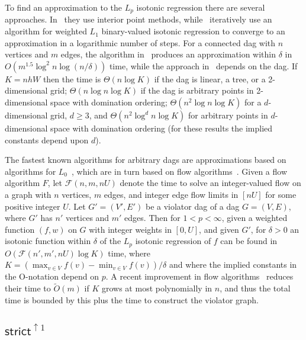 \documentclass[11pt]{article}
\begin{document}
To find an approximation to the $L_p$ isotonic regression there are several approaches.
In~\cite{Yale_AllLp} they use interior point methods, while~\cite{QPartition,QLpviaL0} iteratively use an algorithm for weighted $L_1$ binary-valued isotonic regression to converge to an approximation in a logarithmic number of steps.
For a connected dag with $n$ vertices and $m$ edges, the algorithm in~\cite{Yale_AllLp} produces an approximation within $\delta$ in $O(m^{1.5} \log^2 n \log (n/\delta))$ time, while the approach in~\cite{QPartition} depends on the dag.
If $K = nhW$ then the time is $\Theta(n \log K)$ if the dag is linear, a tree, or a 2-dimensional grid; $\Theta(n \log n \log K)$ if the dag is arbitrary points in 2-dimensional space with domination ordering; $\Theta(n^2 \log n \log K)$ for a $d$-dimensional grid, $d \geq 3$, and $\Theta(n^2 \log^d n \log K)$ for arbitrary points in $d$-dimensional space with domination ordering (for these results the implied constants depend upon $d$).

The fastest known algorithms for arbitrary dags are approximations based on algorithms for $L_0$~\cite{QLpviaL0}, which are in turn based on flow algorithms~\cite{RadeBM_MaxIS}.
Given a flow algorithm $F$, let $\mathcal{F}(n,m,nU)$ denote the time to solve an integer-valued flow on a graph with $n$ vertices, $m$ edges, and integer edge flow limits in $[nU]$ for some positive integer $U$.
Let $G' = (V',E')$ be a violator dag of a dag $G = (V,E)$, where $G'$ has $n'$ vertices and $m'$ edges.
Then for $1 < p < \infty$, given a weighted function $(f,w)$ on $G$ with integer weights in $[0,U]$, and given $G'$, for $\delta > 0$ an isotonic function within $\delta$ of the $L_p$ isotonic regression of $f$ can be found in $O(\mathcal{F}(n',m', nU) \log K)$ time, where $K = \left(\max_{v \in V} f(v)  - \min_{v \in V} f(v)\right)/\delta$ and where the implied constants in the O-notation depend on $p$.
A recent improvement in flow algorithms~\cite{Flow_That} reduces their time to  $\tilde{O}(m)$ if $K$ grows at most polynomially in $n$, and thus the total time is bounded by this plus the time to construct the violator graph.



\subsection{$\mathsf{strict}^{\uparrow 1}$}   \label{sec:strictup1}
\end{document}
